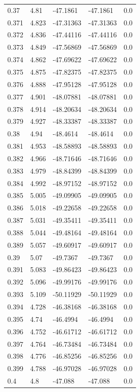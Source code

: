 \begin{tabular}{lllll}
0.37 & 4.81 & -47.1861 & -47.1861 & 0.0 \\
0.371 & 4.823 & -47.31363 & -47.31363 & 0.0 \\
0.372 & 4.836 & -47.44116 & -47.44116 & 0.0 \\
0.373 & 4.849 & -47.56869 & -47.56869 & 0.0 \\
0.374 & 4.862 & -47.69622 & -47.69622 & 0.0 \\
0.375 & 4.875 & -47.82375 & -47.82375 & 0.0 \\
0.376 & 4.888 & -47.95128 & -47.95128 & 0.0 \\
0.377 & 4.901 & -48.07881 & -48.07881 & 0.0 \\
0.378 & 4.914 & -48.20634 & -48.20634 & 0.0 \\
0.379 & 4.927 & -48.33387 & -48.33387 & 0.0 \\
0.38 & 4.94 & -48.4614 & -48.4614 & 0.0 \\
0.381 & 4.953 & -48.58893 & -48.58893 & 0.0 \\
0.382 & 4.966 & -48.71646 & -48.71646 & 0.0 \\
0.383 & 4.979 & -48.84399 & -48.84399 & 0.0 \\
0.384 & 4.992 & -48.97152 & -48.97152 & 0.0 \\
0.385 & 5.005 & -49.09905 & -49.09905 & 0.0 \\
0.386 & 5.018 & -49.22658 & -49.22658 & 0.0 \\
0.387 & 5.031 & -49.35411 & -49.35411 & 0.0 \\
0.388 & 5.044 & -49.48164 & -49.48164 & 0.0 \\
0.389 & 5.057 & -49.60917 & -49.60917 & 0.0 \\
0.39 & 5.07 & -49.7367 & -49.7367 & 0.0 \\
0.391 & 5.083 & -49.86423 & -49.86423 & 0.0 \\
0.392 & 5.096 & -49.99176 & -49.99176 & 0.0 \\
0.393 & 5.109 & -50.11929 & -50.11929 & 0.0 \\
0.394 & 4.728 & -46.38168 & -46.38168 & 0.0 \\
0.395 & 4.74 & -46.4994 & -46.4994 & 0.0 \\
0.396 & 4.752 & -46.61712 & -46.61712 & 0.0 \\
0.397 & 4.764 & -46.73484 & -46.73484 & 0.0 \\
0.398 & 4.776 & -46.85256 & -46.85256 & 0.0 \\
0.399 & 4.788 & -46.97028 & -46.97028 & 0.0 \\
0.4 & 4.8 & -47.088 & -47.088 & 0.0 \\

\end{tabular}

